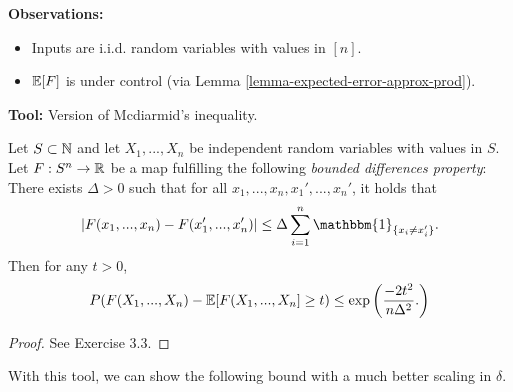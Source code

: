 \textbf{Observations:}%
\begin{itemize}[-,itemsep=0pt]
\item Inputs are i.i.d. random variables with values in $[n]$.
\item $\mathbb{E}[F]$ is under control (via Lemma \ref{lemma-expected-error-approx-prod}).
\end{itemize}
\textbf{Tool:} Version of Mcdiarmid's inequality. 
\begin{theorem} \label{theorem:mcdiarmid}
\begin{mdframed}
Let $S\subset \mathbb{N}$ and let $X_1,...,X_n$ be independent random variables with values in $S$. Let $F:S^n \to \mathbb{R}$ be a map fulfilling the following \emph{bounded differences property}: There exists $\Delta >0$ such that for all $x_1,...,x_n,x_1',...,x_n'$, it holds that \vspace{-0.5pc}
\begin{equation} \label{eq2.10:bounded-diff-prop}
|F(x_1,...,x_n) - F (x_1',...,x_n')| \leq \Delta \sum_{i=1}^n \mathbbm{1}_{\{x_i \neq x_i'\}}.\vspace{-0.5pc}
\end{equation}
Then for any $t>0$, \vspace{-0.5pc}
\begin{equation}
P(F(X_1,...,X_n) - \mathbb{E} [F(X_1,...,X_n] \geq t) \leq \exp \left(
\frac{-2t^2}{n\Delta^2}.
\right)
\end{equation}
\end{mdframed}
\begin{proof}
See Exercise 3.3.
\end{proof}
\end{theorem}
With this tool, we can show the following bound with a much better scaling in $\delta$.

